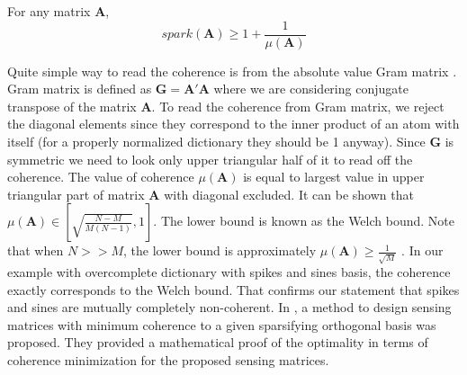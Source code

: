 \documentclass[journal]{IEEEtran}
\begin{document}
For any matrix $\boldsymbol{A}$,
\begin{equation} \label{eq:coherence_spark}
	spark(\boldsymbol{A})\geq 1+\frac{1}{\mu(\boldsymbol{A})}
\end{equation}

Quite simple way to read the coherence is from the absolute value Gram matrix \cite{Elad2010}. Gram matrix is defined as $\boldsymbol{G}=\boldsymbol{A'}\boldsymbol{A}$ where we are considering conjugate transpose of the matrix $\boldsymbol{A}$. To read the coherence from Gram matrix, we reject the diagonal elements since they correspond to the inner product of an atom with itself (for a properly normalized dictionary they should be 1 anyway). Since $\boldsymbol{G}$ is symmetric we need to look only upper triangular half of it to read off the coherence. The value of coherence $\mu(\boldsymbol{A})$ is equal to largest value in upper triangular part of matrix $\boldsymbol{A}$ with diagonal excluded. It can be shown that $\mu(\boldsymbol{A})\in [\sqrt{\frac{N-M}{M(N-1)}}, 1]$. The lower bound is known as the Welch bound. Note that when $N>>M$, the lower bound is approximately $\mu(\boldsymbol{A})\geq \frac{1}{\sqrt{M}}$ \cite{donoho2003optimally}. In our example with overcomplete dictionary with spikes and sines basis, the coherence exactly corresponds to the Welch bound. That confirms our statement that spikes and sines are mutually completely non-coherent. In \cite{Pereira2014}, a method to design sensing matrices with minimum coherence to a given sparsifying orthogonal basis was proposed. They provided a mathematical proof of the optimality in terms of coherence minimization for the proposed sensing matrices.
\end{document}
